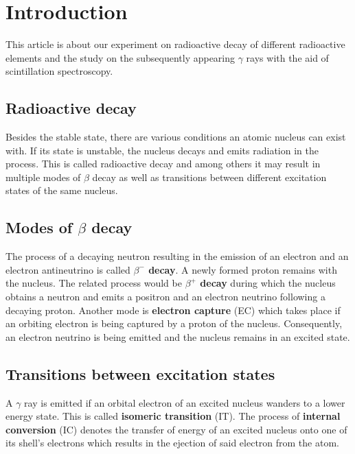 \section*{Introduction}
This article is about our experiment on radioactive decay of different radioactive elements and the study on the subsequently appearing $\gamma$ rays with the aid of scintillation spectroscopy.
%
\subsection*{Radioactive decay}
Besides the stable state, there are various conditions an atomic nucleus can exist with.
If its state is unstable, the nucleus decays and emits radiation in the process.
This is called radioactive decay and among others it may result in multiple modes of $\beta$ decay as well as transitions between different excitation states of the same nucleus.
%
\subsection*{Modes of $\beta$ decay}
The process of a decaying neutron resulting in the emission of an electron and an electron antineutrino is called \textbf{$\beta^{-}$ decay}.
A newly formed proton remains with the nucleus.
The related process would be \textbf{$\beta^{+}$ decay} during which the nucleus obtains a neutron and emits a positron and an electron neutrino following a decaying proton.
Another mode is \textbf{electron capture} (EC) which takes place if an orbiting electron is being captured by a proton of the nucleus. Consequently, an electron neutrino is being emitted and the nucleus remains in an excited state.
%
\subsection*{Transitions between excitation states}
A $\gamma$ ray is emitted if an orbital electron of an excited nucleus wanders to a lower energy state.
This is called \textbf{isomeric transition} (IT).
The process of \textbf{internal conversion} (IC) denotes the transfer of energy of an excited nucleus onto one of its shell's electrons which results in the ejection of said electron from the atom.
%
